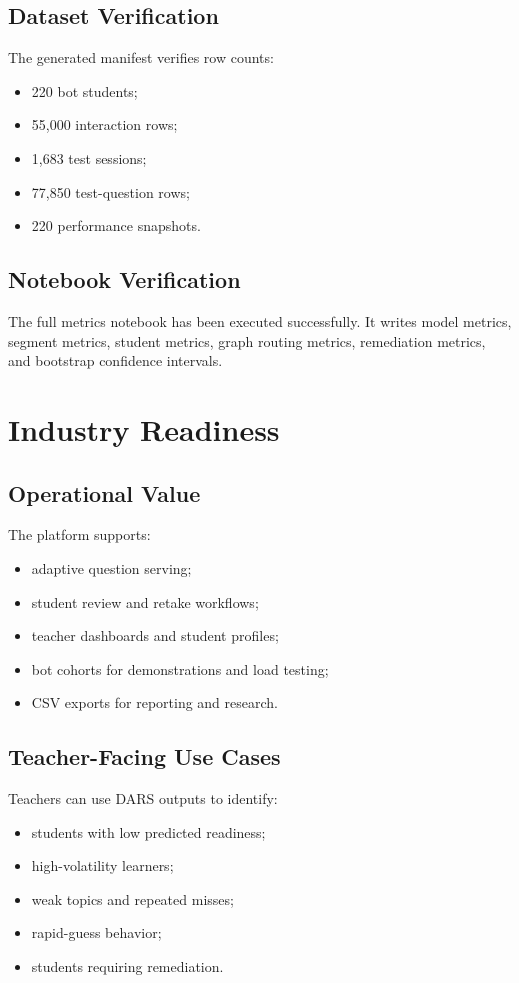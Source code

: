 \documentclass[12pt,a4paper]{report}
\begin{document}
\section{Dataset Verification}
The generated manifest verifies row counts:

\begin{itemize}[leftmargin=*]
  \item 220 bot students;
  \item 55,000 interaction rows;
  \item 1,683 test sessions;
  \item 77,850 test-question rows;
  \item 220 performance snapshots.
\end{itemize}

\section{Notebook Verification}
The full metrics notebook has been executed successfully. It writes model metrics, segment metrics, student metrics, graph routing metrics, remediation metrics, and bootstrap confidence intervals.

\chapter{Industry Readiness}
\section{Operational Value}
The platform supports:

\begin{itemize}[leftmargin=*]
  \item adaptive question serving;
  \item student review and retake workflows;
  \item teacher dashboards and student profiles;
  \item bot cohorts for demonstrations and load testing;
  \item CSV exports for reporting and research.
\end{itemize}

\section{Teacher-Facing Use Cases}
Teachers can use DARS outputs to identify:

\begin{itemize}[leftmargin=*]
  \item students with low predicted readiness;
  \item high-volatility learners;
  \item weak topics and repeated misses;
  \item rapid-guess behavior;
  \item students requiring remediation.
\end{itemize}
\end{document}
